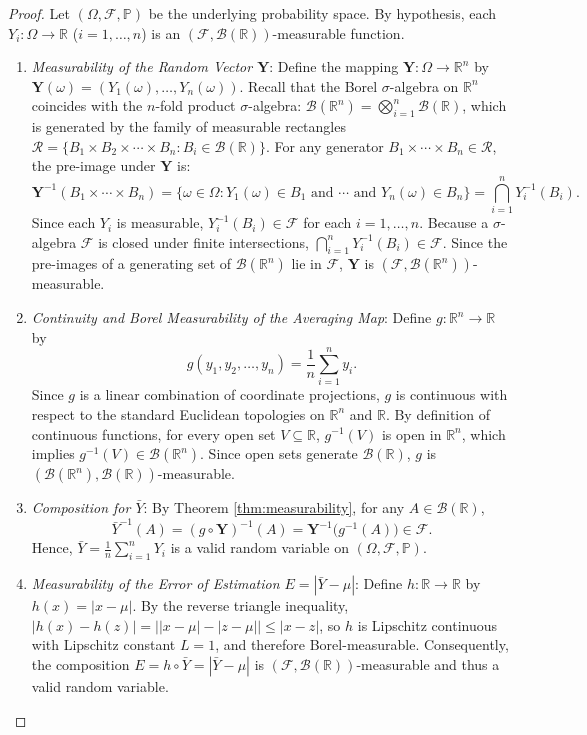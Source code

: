 \documentclass[11pt, letterpaper]{article}
\theoremstyle{definition}
\theoremstyle{remark}
\newcommand{\R}{\mathbb{R}}
\newcommand{\Prob}{\mathbb{P}}
\newcommand{\F}{\mathcal{F}}
\begin{document}
\begin{proof}
Let $(\Omega, \F, \Prob)$ be the underlying probability space. By hypothesis, each $Y_i: \Omega \to \R$ ($i = 1, \dots, n$) is an $(\F, \mathcal{B}(\R))$-measurable function.
\begin{enumerate}[label=\textbf{Step \arabic*:}]
    \item \textit{Measurability of the Random Vector $\mathbf{Y}$}: Define the mapping $\mathbf{Y}: \Omega \to \R^n$ by $\mathbf{Y}(\omega) = (Y_1(\omega), \dots, Y_n(\omega))$. Recall that the Borel $\sigma$-algebra on $\R^n$ coincides with the $n$-fold product $\sigma$-algebra: $\mathcal{B}(\R^n) = \bigotimes_{i=1}^n \mathcal{B}(\R)$, which is generated by the family of measurable rectangles $\mathcal{R} = \{B_1 \times B_2 \times \cdots \times B_n : B_i \in \mathcal{B}(\R)\}$. For any generator $B_1 \times \cdots \times B_n \in \mathcal{R}$, the pre-image under $\mathbf{Y}$ is:
    \[
        \mathbf{Y}^{-1}(B_1 \times \cdots \times B_n) = \{\omega \in \Omega : Y_1(\omega) \in B_1 \text{ and } \cdots \text{ and } Y_n(\omega) \in B_n\} = \bigcap_{i=1}^n Y_i^{-1}(B_i).
    \]
    Since each $Y_i$ is measurable, $Y_i^{-1}(B_i) \in \F$ for each $i = 1, \dots, n$. Because a $\sigma$-algebra $\F$ is closed under finite intersections, $\bigcap_{i=1}^n Y_i^{-1}(B_i) \in \F$. Since the pre-images of a generating set of $\mathcal{B}(\R^n)$ lie in $\F$, $\mathbf{Y}$ is $(\F, \mathcal{B}(\R^n))$-measurable.
    
    \item \textit{Continuity and Borel Measurability of the Averaging Map}: Define $g: \R^n \to \R$ by
    \[
        g(y_1, y_2, \dots, y_n) = \frac{1}{n} \sum_{i=1}^n y_i.
    \]
    Since $g$ is a linear combination of coordinate projections, $g$ is continuous with respect to the standard Euclidean topologies on $\R^n$ and $\R$. By definition of continuous functions, for every open set $V \subseteq \R$, $g^{-1}(V)$ is open in $\R^n$, which implies $g^{-1}(V) \in \mathcal{B}(\R^n)$. Since open sets generate $\mathcal{B}(\R)$, $g$ is $(\mathcal{B}(\R^n), \mathcal{B}(\R))$-measurable.
    
    \item \textit{Composition for $\bar{Y}$}: By Theorem \ref{thm:measurability}, for any $A \in \mathcal{B}(\R)$,
    \[
        \bar{Y}^{-1}(A) = (g \circ \mathbf{Y})^{-1}(A) = \mathbf{Y}^{-1}\big(g^{-1}(A)\big) \in \F.
    \]
    Hence, $\bar{Y} = \frac{1}{n}\sum_{i=1}^n Y_i$ is a valid random variable on $(\Omega, \F, \Prob)$.
    
    \item \textit{Measurability of the Error of Estimation $E = |\bar{Y} - \mu|$}: Define $h: \R \to \R$ by $h(x) = |x - \mu|$. By the reverse triangle inequality, $|h(x) - h(z)| = \big||x - \mu| - |z - \mu|\big| \le |x - z|$, so $h$ is Lipschitz continuous with Lipschitz constant $L = 1$, and therefore Borel-measurable. Consequently, the composition $E = h \circ \bar{Y} = |\bar{Y} - \mu|$ is $(\F, \mathcal{B}(\R))$-measurable and thus a valid random variable.
\end{enumerate}
\end{proof}
\end{document}
